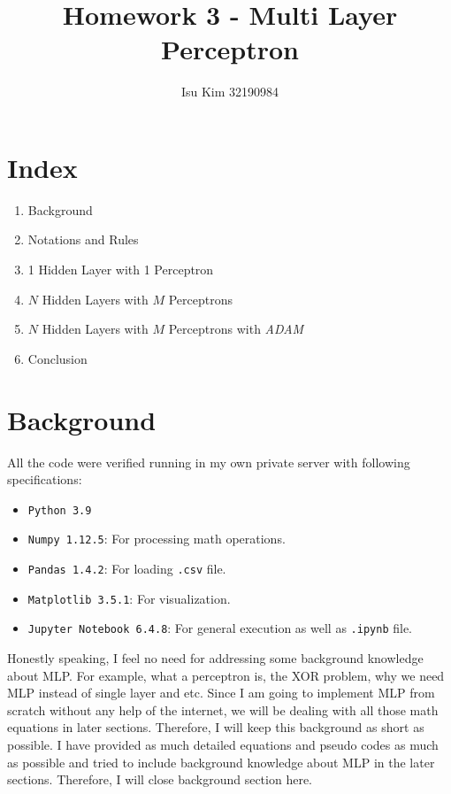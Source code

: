 \documentclass{homework}
\begin{document}
\title{Homework 3 - Multi Layer Perceptron}
\author{Isu Kim 32190984}


\maketitle

\setcounter{section}{-1}
\section{Index}
\label{sec:index}
\begin{enumerate}
    \item Background
    \item Notations and Rules
    \item 1 Hidden Layer with 1 Perceptron
    \item $N$ Hidden Layers with $M$ Perceptrons
    \item $N$ Hidden Layers with $M$ Perceptrons with \textit{ADAM} 
    \item Conclusion
\end{enumerate}

\section{Background}
All the code were verified running in my own private server with following specifications:

\begin{itemize}
  \item \texttt{Python 3.9}
  \item \texttt{Numpy 1.12.5}: For processing math operations.
  \item \texttt{Pandas 1.4.2}: For loading \texttt{.csv} file.
  \item \texttt{Matplotlib 3.5.1}: For visualization.
  \item \texttt{Jupyter Notebook 6.4.8}: For general execution as well as \texttt{.ipynb} file.
\end{itemize}

Honestly speaking, I feel no need for addressing some background knowledge about MLP. For example, what a perceptron is, the XOR problem, why we need MLP instead of single layer and etc. Since I am going to implement MLP from scratch without any help of the internet, we will be dealing with all those math equations in later sections. Therefore, I will keep this background as short as possible. I have provided as much detailed equations and pseudo codes as much as possible and tried to include background knowledge about MLP in the later sections. Therefore, I will close background section here.
\end{document}
